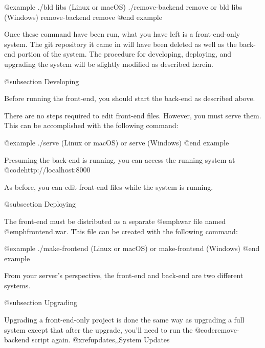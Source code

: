 @example
./bld libs                   (Linux or macOS)
./remove-backend remove
    or
bld libs                     (Windows)
remove-backend remove
@end example

Once these command have been run, what you have left is a front-end-only system.  The git 
repository it came in will have been deleted as well as the back-end portion of the system.
The procedure for developing, deploying, and upgrading the system will be slightly modified as 
described herein.


@subsection Developing

Before running the front-end, you should start the back-end as described above.

There are no steps required to edit front-end files.  However, you must serve them.  This can be accomplished with the following command:

@example
./serve          (Linux or macOS)
    or
serve            (Windows)
@end example

Presuming the back-end is running, you can access the running system at @code{http://localhost:8000}

As before, you can edit front-end files while the system is running.

@subsection Deploying

The front-end must be distributed as a separate @emph{war} file named @emph{frontend.war}.  
This file can be created with the following command:

@example
./make-frontend         (Linux or macOS)
     or
make-frontend           (Windows)
@end example

From your server's perspective, the front-end and back-end are two different systems.

@subsection Upgrading

Upgrading a front-end-only project is done the same way as upgrading a full system except that after the upgrade, you'll need to run the 
@code{remove-backend} script again. @xref{updates,,System Updates}
